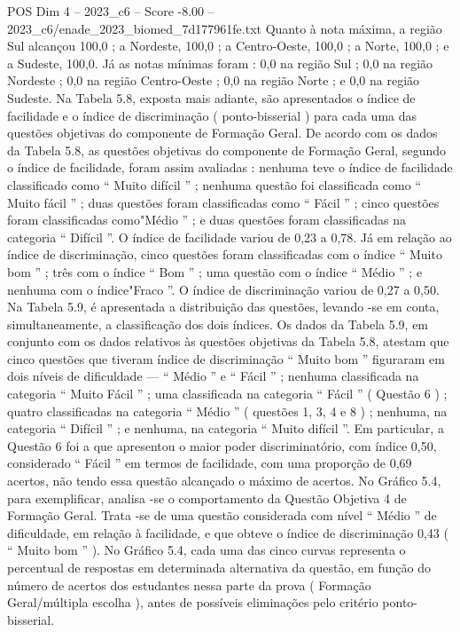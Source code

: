 \begin{textsample}{POS Dim 4 – 2023\_c6 – Score -8.00 – 2023\_c6/enade\_2023\_biomed\_7d177961fe.txt}
Quanto à nota máxima, a região Sul alcançou 100,0 ; a Nordeste, 100,0 ; a Centro-Oeste, 100,0 ; a Norte, 100,0 ; e a Sudeste, 100,0.
Já as notas mínimas foram : 0,0 na região Sul ; 0,0 na região Nordeste ; 0,0 na região Centro-Oeste ; 0,0 na região Norte ; e 0,0 na região Sudeste.
Na Tabela 5.8, exposta mais adiante, são apresentados o índice de facilidade e o índice de discriminação ( ponto-bisserial ) para cada uma das questões objetivas do componente de Formação Geral.
De acordo com os dados da Tabela 5.8, as questões objetivas do componente de Formação Geral, segundo o índice de facilidade, foram assim avaliadas : nenhuma teve o índice de facilidade classificado como “ Muito difícil ” ; nenhuma questão foi classificada como “ Muito fácil ” ; duas questões foram classificadas como “ Fácil ” ; cinco questões foram classificadas como"Médio ” ; e duas questões foram classificadas na categoria “ Difícil ”.
O índice de facilidade variou de 0,23 a 0,78.
Já em relação ao índice de discriminação, cinco questões foram classificadas com o índice “ Muito bom ” ; três com o índice “ Bom ” ; uma questão com o índice “ Médio ” ; e nenhuma com o índice"Fraco ”.
O índice de discriminação variou de 0,27 a 0,50.
Na Tabela 5.9, é apresentada a distribuição das questões, levando -se em conta, simultaneamente, a classificação dos dois índices.
Os dados da Tabela 5.9, em conjunto com os dados relativos às questões objetivas da Tabela 5.8, atestam que cinco questões que tiveram índice de discriminação “ Muito bom ” figuraram em dois níveis de dificuldade — “ Médio ” e “ Fácil ” ; nenhuma classificada na categoria “ Muito Fácil ” ; uma classificada na categoria “ Fácil ” ( Questão 6 ) ; quatro classificadas na categoria “ Médio ” ( questões 1, 3, 4 e 8 ) ; nenhuma, na categoria “ Difícil ” ; e nenhuma, na categoria “ Muito difícil ”.
Em particular, a Questão 6 foi a que apresentou o maior poder discriminatório, com índice 0,50, considerado “ Fácil ” em termos de facilidade, com uma proporção de 0,69 acertos, não tendo essa questão alcançado o máximo de acertos.
No Gráfico 5.4, para exemplificar, analisa -se o comportamento da Questão Objetiva 4 de Formação Geral.
Trata -se de uma questão considerada com nível “ Médio ” de dificuldade, em relação à facilidade, e que obteve o índice de discriminação 0,43 ( “ Muito bom ” ).
No Gráfico 5.4, cada uma das cinco curvas representa o percentual de respostas em determinada alternativa da questão, em função do número de acertos dos estudantes nessa parte da prova ( Formação Geral/múltipla escolha ), antes de possíveis eliminações pelo critério ponto-bisserial.

\end{textsample}
